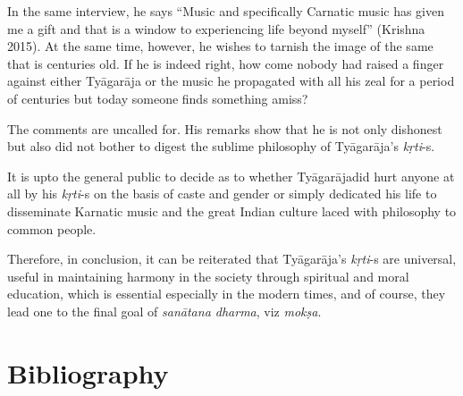 In the same interview, he says “Music and specifically Carnatic music has given me a gift and that is a window to experiencing life beyond myself” (Krishna 2015). At the same time, however, he wishes to tarnish the image of the same that is centuries old. If he is indeed right, how come nobody had raised a finger against either Tyāgarāja or the music he propagated with all his zeal for a period of centuries but today someone finds something amiss? 

The comments are uncalled for. His remarks show that he is not only dishonest but also did not bother to digest the sublime philosophy of Tyāgarāja’s \textit{kṛti}-s. 

It is upto the general public to decide as to whether Tyāgarājadid hurt anyone at all by his \textit{kṛti}-s on the basis of caste and gender or simply dedicated his life to disseminate Karnatic music and the great Indian culture laced with philosophy to common people.

Therefore, in conclusion, it can be reiterated that Tyāgarāja’s \textit{kṛti}-s are universal, useful in maintaining harmony in the society through spiritual and moral education, which is essential especially in the modern times, and of course, they lead one to the final goal of \textit{sanātana dharma}, viz \textit{mokṣa}.


\section*{Bibliography}

